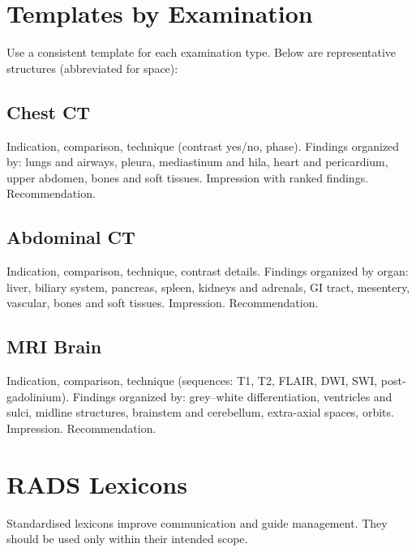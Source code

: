 \section{Templates by Examination}
Use a consistent template for each examination type. Below are representative structures (abbreviated for space):

\subsection{Chest CT}
Indication, comparison, technique (contrast yes/no, phase). Findings organized by: lungs and airways, pleura, mediastinum and hila, heart and pericardium, upper abdomen, bones and soft tissues. Impression with ranked findings. Recommendation.

\subsection{Abdominal CT}
Indication, comparison, technique, contrast details. Findings organized by organ: liver, biliary system, pancreas, spleen, kidneys and adrenals, GI tract, mesentery, vascular, bones and soft tissues. Impression. Recommendation.

\subsection{MRI Brain}
Indication, comparison, technique (sequences: T1, T2, FLAIR, DWI, SWI, post-gadolinium). Findings organized by: grey--white differentiation, ventricles and sulci, midline structures, brainstem and cerebellum, extra-axial spaces, orbits. Impression. Recommendation.

\section{RADS Lexicons}
Standardised lexicons improve communication and guide management. They should be used only within their intended scope.

